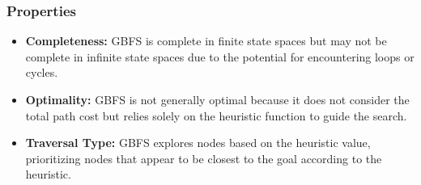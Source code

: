 \subsubsection*{Properties}
\begin{itemize}
    \item \textbf{Completeness:} GBFS is complete in finite state spaces but may not be complete in infinite state spaces due to the potential for encountering loops or cycles.
    \item \textbf{Optimality:} GBFS is not generally optimal because it does not consider the total path cost but relies solely on the heuristic function to guide the search.
    \item \textbf{Traversal Type:} GBFS explores nodes based on the heuristic value, prioritizing nodes that appear to be closest to the goal according to the heuristic.
\end{itemize}